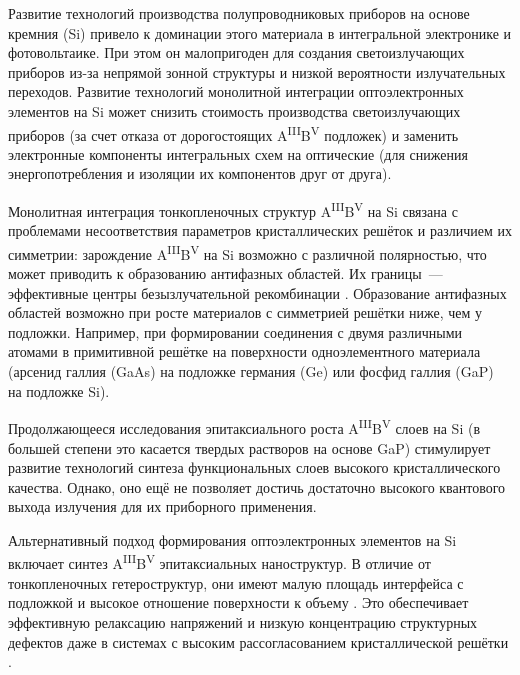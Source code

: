 
{\actuality} 
Развитие технологий производства полупроводниковых приборов на основе кремния (Si) привело к  доминации этого материала в интегральной электронике и фотовольтаике. При этом он малопригоден для создания светоизлучающих приборов из-за непрямой зонной структуры и низкой вероятности излучательных переходов. Развитие технологий монолитной интеграции оптоэлектронных элементов на Si может снизить стоимость производства светоизлучающих приборов (за счет отказа от дорогостоящих A\textsuperscript{III}B\textsuperscript{V} подложек) и заменить электронные компоненты интегральных схем на оптические (для снижения энергопотребления и изоляции их компонентов друг от друга).

Монолитная интеграция тонкопленочных структур A\textsuperscript{III}B\textsuperscript{V} на Si связана с проблемами несоответствия параметров кристаллических решёток и различием их симметрии: зарождение A\textsuperscript{III}B\textsuperscript{V} на Si возможно с различной полярностью, что может приводить к образованию антифазных областей. Их границы~--- эффективные центры безызлучательной рекомбинации \cite{Takagi1998}. Образование антифазных областей возможно при росте материалов с симметрией решётки ниже, чем у подложки. Например, при формировании соединения с двумя различными атомами в примитивной решётке на поверхности одноэлементного материала (арсенид галлия (GaAs) на подложке германия (Ge) или фосфид галлия (GaP) на подложке Si). 

Продолжающееся исследования эпитаксиального роста A\textsuperscript{III}B\textsuperscript{V} слоев на Si (в большей степени это касается твердых растворов на основе GaP) стимулирует развитие технологий синтеза функциональных слоев высокого кристаллического качества. Однако, оно ещё не позволяет достичь достаточно высокого квантового выхода излучения для их приборного применения.

Альтернативный подход формирования оптоэлектронных элементов на Si включает синтез A\textsuperscript{III}B\textsuperscript{V} эпитаксиальных наноструктур. В отличие от тонкопленочных гетероструктур, они имеют малую площадь интерфейса с подложкой и высокое отношение поверхности к объему \cite{Bolshakov2013, Tchernycheva2007}. Это обеспечивает эффективную релаксацию напряжений и низкую концентрацию структурных дефектов даже в системах с высоким рассогласованием кристаллической решётки \cite{Samsonenko2011}.

